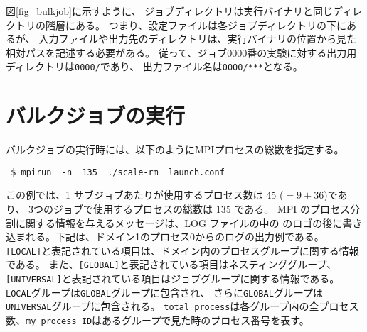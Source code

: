 図\ref{fig_bulkjob}に示すように、
ジョブディレクトリは実行バイナリと同じディレクトリの階層にある。
つまり、設定ファイルは各ジョブディレクトリの下にあるが、
入力ファイルや出力先のディレクトリは、実行バイナリの位置から見た相対パスを記述する必要がある。
従って、ジョブ0000番の実験に対する出力用ディレクトリは\verb|0000/|であり、
出力ファイル名は\verb|0000/***|となる。
{\color{blue}{ジョブディレクトリ名を付け忘れてファイル名を全実験で同じにしてしまうと、同じファイルに出力を行うためデータが消失することに注意されたい。}}

\section{バルクジョブの実行}
バルクジョブの実行時には、以下のようにMPIプロセスの総数を指定する。
\begin{verbatim}
 $ mpirun  -n  135  ./scale-rm  launch.conf
\end{verbatim}
この例では、1 サブジョブあたりが使用するプロセス数は 45 ($=9 + 36$)であり、
3つのジョブで使用するプロセスの総数は 135 である。
MPI のプロセス分割に関する情報を与えるメッセージは、LOG ファイルの中の \scalelib のロゴの後に書き込まれる。下記は、ドメイン1のプロセス0からのログの出力例である。\\
\verb|[LOCAL]|と表記されている項目は、ドメイン内のプロセスグループに関する情報である。
また、\verb|[GLOBAL]|と表記されている項目はネスティンググループ、
\verb|[UNIVERSAL]|と表記されている項目はジョブグループに関する情報である。
\verb|LOCAL|グループは\verb|GLOBAL|グループに包含され、
さらに\verb|GLOBAL|グループは\verb|UNIVERSAL|グループに包含される。
\verb|total process|は各グループ内の全プロセス数、\verb|my process ID|はあるグループで見た時のプロセス番号を表す。

